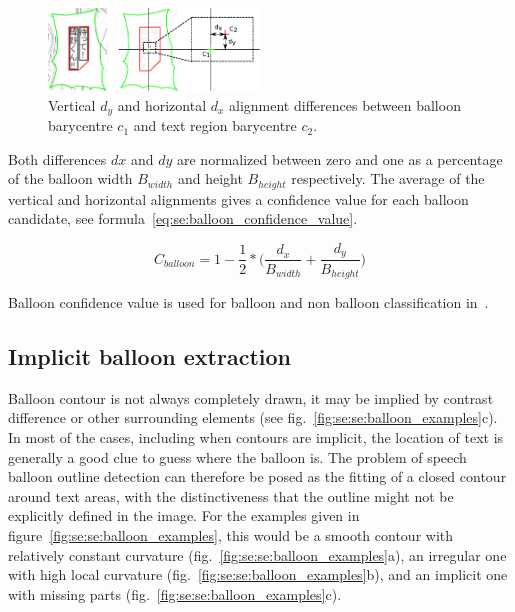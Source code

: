 	\begin{figure}[h!]	%
	  \centering
		\includegraphics[trim= 140px 0px 0px 0px, clip, width=0.5\textwidth]{text_balloon_alignment.pdf}
		\caption{Vertical $d_y$ and horizontal $d_x$ alignment differences between balloon barycentre $c_1$ and text region barycentre $c_2$.}
		\label{fig:se:se:align_diff}
	\end{figure}

Both differences $dx$ and $dy$ are normalized between zero and one as a percentage of the balloon width $B_{width}$ and height $B_{height}$ respectively.
The average of the vertical and horizontal alignments gives a confidence value for each balloon candidate, see formula~\ref{eq:se:balloon_confidence_value}.


\begin{equation}
	\label{eq:se:balloon_confidence_value}
	C_{balloon} = 1 - \frac{1}{2} *  \bigg( \frac{d_x}{B_{width}} + \frac{d_y}{B_{height}} \bigg)
\end{equation}

Balloon confidence value is used for balloon and non balloon classification in~.




\subsection{Implicit balloon extraction} %
\label{sub:implicit_balloon_extraction}

Balloon contour is not always completely drawn, it may be implied by contrast difference or other surrounding elements (see fig.~\ref{fig:se:se:balloon_examples}c).
In most of the cases, including when contours are implicit, the location of text is generally a good clue to guess where the balloon is.
The problem of speech balloon outline detection can therefore be posed as the fitting of a closed contour around text areas, with the distinctiveness that the outline might not be explicitly defined in the image.
For the examples given in figure~\ref{fig:se:se:balloon_examples}, this would be a smooth contour with relatively constant curvature (fig.~\ref{fig:se:se:balloon_examples}a), an irregular one with high local curvature (fig.~\ref{fig:se:se:balloon_examples}b), and an implicit one with missing parts (fig.~\ref{fig:se:se:balloon_examples}c).

